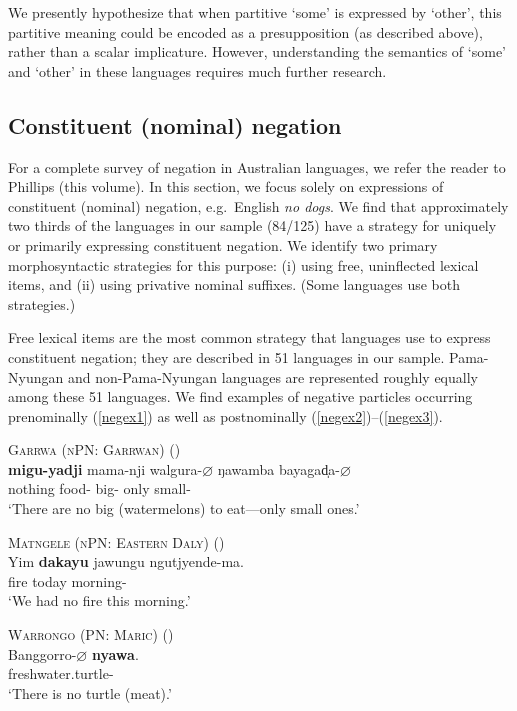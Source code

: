\documentclass[12pt,egregdoesnotlikesansseriftitles]{scrartcl}
\newcommand{\ofy}{/125} %
\begin{document}
We presently hypothesize that when partitive `some' is expressed by `other', this partitive meaning could be encoded as a presupposition (as described above), rather than a scalar implicature.  However, understanding the semantics of `some' and `other' in these languages requires much further research.


\subsection{Constituent (nominal) negation}
\label{sec:neg}
For a complete survey of negation in Australian languages, we refer the reader to Phillips (this volume). In this section, we focus solely on expressions of constituent (nominal) negation, e.g.\ English \textit{no dogs}. We find that approximately two thirds of the languages in our sample (84\ofy) have a strategy for uniquely or primarily expressing constituent negation.  We identify two primary morphosyntactic  strategies for this purpose: (i) using free, uninflected lexical items, and (ii) using privative nominal suffixes. (Some languages use both strategies.)

Free lexical items are the most common strategy that languages use to express constituent negation; they are described in 51 languages in our sample. Pama-Nyungan and non-Pama-Nyungan languages are represented roughly equally among these 51 languages. We find examples of negative particles occurring prenominally (\ref{negex1}) as well as postnominally (\ref{negex2})--(\ref{negex3}).

\begin{exe}
  \ex \textsc{Garrwa (nPN: Garrwan)} \hfill (\citealt[37]{furby77}) \\
  \gll \textbf{migu-yadji}    mama-nji    walgura-$\varnothing$    ŋawamba    bayagad̩a-$\varnothing$\\
  nothing  food-\Refr{} big-\Nom{} only  small-\Nom\\
  \glt `There are no big (watermelons) to eat---only small ones.' \label{negex1}

  \ex \textsc{Matngele (nPN: Eastern Daly)} \hfill (\citealt[102]{zandvoort99})\\
  \gll Yim \textbf{dakayu} jawungu ngutjyende-ma.\\
  fire \Neg{} today morning-\Prm\\
  \glt `We had no fire this morning.' \label{negex2} %

  \ex \textsc{Warrongo (PN: Maric)} \hfill (\citealt[660]{tsunoda11})\\
  \gll Banggorro-$\varnothing$ \textbf{nyawa}.\\
  freshwater.turtle-\Nom{} \Neg\\
  \glt `There is no turtle (meat).' \label{negex3}
\end{exe}
 
\end{document}
